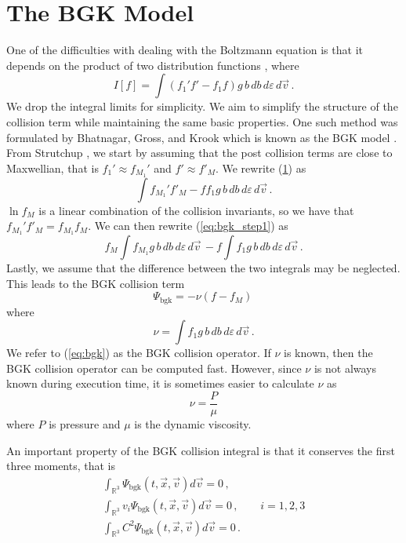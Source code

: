 \documentclass[12pt]{CSUNthesis}
\newcommand{\vecv}{\vec{v}}
\begin{document}
\section{The BGK Model}
\label{eq:coll_bgk_sec}
One of the difficulties with dealing with the Boltzmann equation is that it depends on the product of two distribution functions \cite{Kremer2010}, where
\begin{equation}
I[f] = \int(f_1' f' - f_1 f) g\, b \, db\, d\varepsilon\, d\vecv\, .
\end{equation}
We drop the integral limits for simplicity. We aim to simplify the structure of the collision term while maintaining the same basic properties. One such method was formulated by Bhatnagar, Gross, and Krook which is known as the BGK model \cite{BGK54}. From Strutchup \cite{Struchtrup2005}, we start by assuming that the post collision terms are close to Maxwellian, that is $f_1' \approx f_{M_1}'$ and $f' \approx f'_{M}$. We rewrite (\ref{eq:coll_bgk_sec}) as
\begin{equation}
\label{eq:bgk_step1}
\int  f_{M_1}' f'_{M} - f f_1 g\, b \, db\, d\varepsilon\, d\vecv\, .
\end{equation}
$\ln f_M$ is a linear combination of the collision invariants, so we have that $f_{M_1}' f'_{M}=f_{M_1} f_{M}$. We can then rewrite (\ref{eq:bgk_step1}) as 
\begin{equation}
\label{eq:bgk_step2}
f_M \int f_{M_1} g\, b \, db\, d\varepsilon\, d\vecv\, - f \int f_1 g\, b \, db\, d\varepsilon\, d\vecv\, .
\end{equation}
Lastly, we assume that the difference between the two integrals may be neglected. This leads to the BGK collision term
\begin{equation}
\label{eq:bgk}
\Psi_{\text{bgk}} = -\nu(f-f_M)\, 
\end{equation}
where
\begin{equation}
\nu = \int f_1 g\, b \, db\, d\varepsilon\, d\vecv\, .
\end{equation}
We refer to (\ref{eq:bgk}) as the BGK collision operator. If $\nu$ is known, then the BGK collision operator can be computed fast. However, since $\nu$ is not always known during execution time, it is sometimes easier to calculate $\nu$ as
\begin{equation}
\nu = \frac{P}{\mu}
\end{equation}
where $P$ is pressure and $\mu$ is the dynamic viscosity.

An important property of the BGK collision integral is that it conserves the first three moments, that is
\begin{equation}
\label{eq:bgk_conservative}
\begin{split}
	\int_{\mathbb{R}^3}  \Psi_{\text{bgk}}(t,\vec{x},\vec{v}) d\vec{v} = 0\, , & \\
	\int_{\mathbb{R}^3} v_i \Psi_{\text{bgk}}(t,\vec{x},\vec{v}) d\vec{v} = 0\, , & \quad i=1,2,3  \\
	\int_{\mathbb{R}^3} C^2 \Psi_{\text{bgk}}(t,\vec{x},\vec{v}) d\vec{v} = 0 \, .&
\end{split}
\end{equation}
\end{document}
